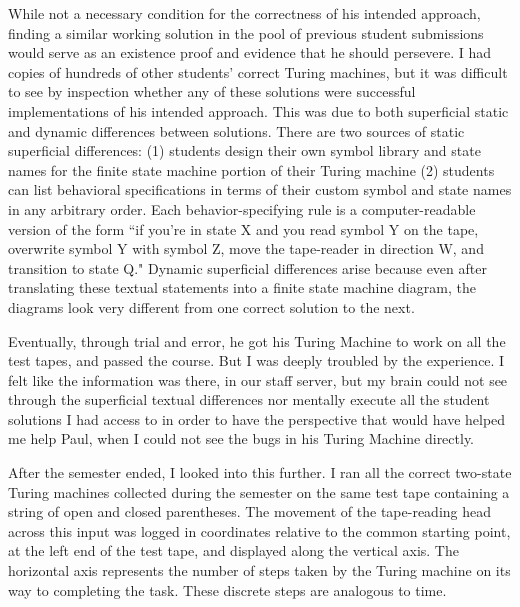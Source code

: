 While not a necessary condition for the correctness of his intended approach, finding a similar working solution in the pool of previous student submissions would serve as an existence proof and evidence that he should persevere. I had copies of hundreds of other students' correct Turing machines, but it was difficult to see by inspection whether any of these solutions were successful implementations of his intended approach. This was due to both superficial static and dynamic differences between solutions. There are two sources of static superficial differences: (1) students design their own symbol library and state names for the finite state machine portion of their Turing machine (2) students can list behavioral specifications in terms of their custom symbol and state names in any arbitrary order. Each behavior-specifying rule is a computer-readable version of the form ``if you're in state X and you read symbol Y on the tape, overwrite symbol Y with symbol Z, move the tape-reader in direction W, and transition to state Q." Dynamic superficial differences arise because even after translating these textual statements into a finite state machine diagram, the diagrams look very different from one correct solution to the next.

Eventually, through trial and error, he got his Turing Machine to work on all the test tapes, and passed the course. But I was deeply troubled by the experience. I felt like the information was there, in our staff server, but my brain could not see through the superficial textual differences nor mentally execute all the student solutions I had access to in order to have the perspective that would have helped me help Paul, when I could not see the bugs in his Turing Machine directly.

After the semester ended, I looked into this further. I ran all the correct two-state Turing machines collected during the semester on the same test tape containing a string of open and closed parentheses. The movement of the tape-reading head across this input was logged in coordinates relative to the common starting point, at the left end of the test tape, and displayed along the vertical axis. The horizontal axis represents the number of steps taken by the Turing machine on its way to completing the task. These discrete steps are analogous to time. 

